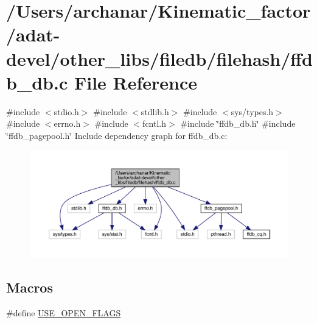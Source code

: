 \hypertarget{adat-devel_2other__libs_2filedb_2filehash_2ffdb__db_8c}{}\section{/\+Users/archanar/\+Kinematic\+\_\+factor/adat-\/devel/other\+\_\+libs/filedb/filehash/ffdb\+\_\+db.c File Reference}
\label{adat-devel_2other__libs_2filedb_2filehash_2ffdb__db_8c}
{\ttfamily \#include $<$stdio.\+h$>$}\newline
{\ttfamily \#include $<$stdlib.\+h$>$}\newline
{\ttfamily \#include $<$sys/types.\+h$>$}\newline
{\ttfamily \#include $<$errno.\+h$>$}\newline
{\ttfamily \#include $<$fcntl.\+h$>$}\newline
{\ttfamily \#include \char`\"{}ffdb\+\_\+db.\+h\char`\"{}}\newline
{\ttfamily \#include \char`\"{}ffdb\+\_\+pagepool.\+h\char`\"{}}\newline
Include dependency graph for ffdb\+\_\+db.\+c\+:
\nopagebreak
\begin{figure}[H]
\begin{center}
\leavevmode
\includegraphics[width=350pt]{da/dcc/adat-devel_2other__libs_2filedb_2filehash_2ffdb__db_8c__incl}
\end{center}
\end{figure}
\subsection*{Macros}
\begin{DoxyCompactItemize}
\item 
\#define \mbox{\hyperlink{adat-devel_2other__libs_2filedb_2filehash_2ffdb__db_8c_abd9515294d2a64b57210563fa8795b99}{U\+S\+E\+\_\+\+O\+P\+E\+N\+\_\+\+F\+L\+A\+GS}}
\end{DoxyCompactItemize}
